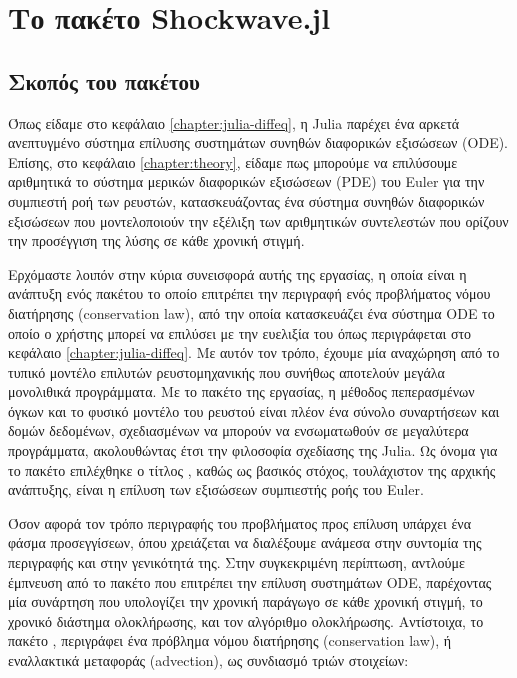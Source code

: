 \chapter{Το πακέτο Shockwave.jl}
\label{chapter:shockwave}

\section{Σκοπός του πακέτου}

Όπως είδαμε στο κεφάλαιο \ref{chapter:julia-diffeq}, η Julia παρέχει ένα αρκετά ανεπτυγμένο σύστημα επίλυσης συστημάτων συνηθών διαφορικών εξισώσεων (ODE).
Επίσης, στο κεφάλαιο \ref{chapter:theory}, είδαμε πως μπορούμε να επιλύσουμε αριθμητικά το σύστημα μερικών διαφορικών εξισώσεων (PDE) του Euler για την συμπιεστή ροή των ρευστών, κατασκευάζοντας ένα σύστημα συνηθών διαφορικών εξισώσεων που μοντελοποιούν την εξέλιξη των αριθμητικών συντελεστών που ορίζουν την προσέγγιση της λύσης σε κάθε χρονική στιγμή.

Ερχόμαστε λοιπόν στην κύρια συνεισφορά αυτής της εργασίας, η οποία είναι η ανάπτυξη ενός πακέτου το οποίο επιτρέπει την περιγραφή ενός προβλήματος νόμου διατήρησης (conservation law), από την οποία κατασκευάζει ένα σύστημα ODE το οποίο ο χρήστης μπορεί να επιλύσει με την ευελιξία του  όπως περιγράφεται στο κεφάλαιο \ref{chapter:julia-diffeq}.
Με αυτόν τον τρόπο, έχουμε μία αναχώρηση από το τυπικό μοντέλο επιλυτών ρευστομηχανικής που συνήθως αποτελούν μεγάλα μονολιθικά προγράμματα.
Με το πακέτο της εργασίας, η μέθοδος πεπερασμένων όγκων και το φυσικό μοντέλο του ρευστού είναι πλέον ένα σύνολο συναρτήσεων και δομών δεδομένων, σχεδιασμένων να μπορούν να ενσωματωθούν σε μεγαλύτερα προγράμματα, ακολουθώντας έτσι την φιλοσοφία σχεδίασης της Julia.
Ως όνομα για το πακέτο επιλέχθηκε ο τίτλος , καθώς ως βασικός στόχος, τουλάχιστον της αρχικής ανάπτυξης, είναι η επίλυση των εξισώσεων συμπιεστής ροής του Euler.

Όσον αφορά τον τρόπο περιγραφής του προβλήματος προς επίλυση υπάρχει ένα φάσμα προσεγγίσεων, όπου χρειάζεται να διαλέξουμε ανάμεσα στην συντομία της περιγραφής και στην γενικότητά της.
Στην συγκεκριμένη περίπτωση, αντλούμε έμπνευση από το πακέτο  που επιτρέπει την επίλυση συστημάτων ODE, παρέχοντας μία συνάρτηση που υπολογίζει την χρονική παράγωγο σε κάθε χρονική στιγμή, το χρονικό διάστημα ολοκλήρωσης, και τον αλγόριθμο ολοκλήρωσης.
Αντίστοιχα, το πακέτο , περιγράφει ένα πρόβλημα νόμου διατήρησης (conservation law), ή εναλλακτικά μεταφοράς (advection), ως συνδιασμό τριών στοιχείων:

